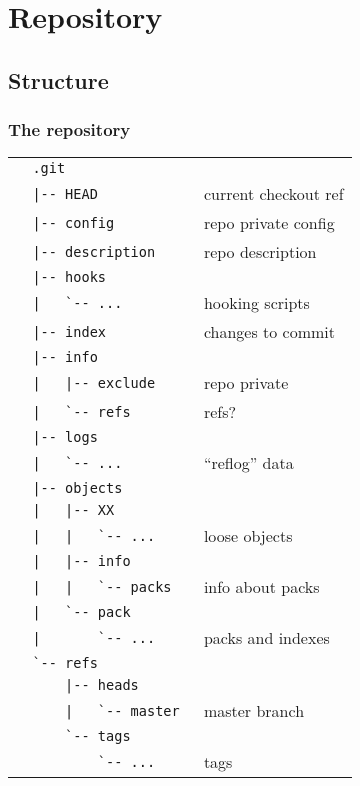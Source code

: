 \documentclass[english]{beamer}
\newcommand{\mysection}[2]{
  \hypertarget{#2}{}
  \section{#1}
  \label{#2}
}
\newcommand{\mysubsection}[2]{
  \hypertarget{#2}{}
  \subsection{#1}
  \label{#2}
}
\begin{document}
\mysection{Repository}{_repository}
\mysubsection{Structure}{repo:structure}
\begin{frame}[fragile]
\frametitle{The repository}
{\tiny
\begin{tabular}{ll}
        \verb!  .git               !  & \\
        \verb!  |-- HEAD           !  & current checkout ref \\
        \verb!  |-- config         !  & repo private config \\
        \verb!  |-- description    !  & repo description \\
        \verb!  |-- hooks          !  & \\
        \verb!  |   `-- ...        !  & hooking scripts \\
        \verb!  |-- index          !  & changes to commit \\
        \verb!  |-- info           !  & \\
        \verb!  |   |-- exclude    !  & repo private \\
        \verb!  |   `-- refs       !  & refs? \\
        \verb!  |-- logs           !  & \\
        \verb!  |   `-- ...        !  & ``reflog'' data \\
        \verb!  |-- objects        !  & \\
        \verb!  |   |-- XX         !  & \\
        \verb!  |   |   `-- ...    !  & loose objects \\
        \verb!  |   |-- info       !  & \\
        \verb!  |   |   `-- packs  !  & info about packs \\
        \verb!  |   `-- pack       !  & \\
        \verb!  |       `-- ...    !  & packs and indexes \\
        \verb!  `-- refs           !  & \\
        \verb!      |-- heads      !  & \\
        \verb!      |   `-- master !  & master branch \\
        \verb!      `-- tags       !  & \\
        \verb!          `-- ...    !  & tags \\
\end{tabular}
}
\end{frame}
\end{document}
